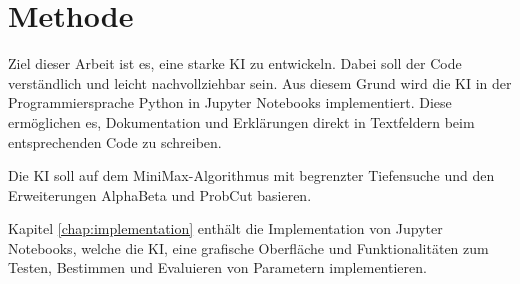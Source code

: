 
\chapter{Methode}
\label{chap:methode}

Ziel dieser Arbeit ist es, eine starke KI zu entwickeln. Dabei soll der Code verständlich und leicht nachvollziehbar
sein. Aus diesem Grund wird die KI in der Programmiersprache Python in Jupyter Notebooks implementiert. Diese
ermöglichen es, Dokumentation und Erklärungen direkt in Textfeldern beim entsprechenden Code zu schreiben.

Die KI soll auf dem MiniMax-Algorithmus mit begrenzter Tiefensuche und den Erweiterungen AlphaBeta und ProbCut basieren.

Kapitel \ref{chap:implementation} enthält die Implementation von Jupyter Notebooks, welche die KI, eine grafische Oberfläche und Funktionalitäten zum Testen, Bestimmen und Evaluieren von Parametern implementieren.
